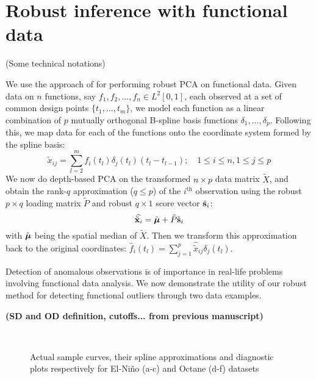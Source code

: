 \section{Robust inference with functional data}

{\colrbf (Some technical notations)}

We use the approach of \cite{BoenteBarrera15} for performing robust PCA on functional data. Given data on $n$ functions, say $f_1, f_2, ..., f_n \in L^2[0,1]$, each observed at a set of common design points $\{ t_1, ..., t_m \} $, we model each function as a linear combination of $p$ mutually orthogonal B-spline basis functions $\delta_1, ..., \delta_p$. Following this, we map data for each of the functions onto the coordinate system formed by the spline basis:
%
\begin{equation}
\tilde x_{ij} = \sum_{l=2}^m f_i(t_l) \delta_j(t_l) (t_l - t_{l-1}); \quad 1 \leq i \leq n, 1 \leq j \leq p
\end{equation}
%
We now do depth-based PCA on the transformed $n \times p$ data matrix $\tilde X$, and obtain the rank-$q$ approximation ($q \leq p$) of the $i^\text{th}$ observation using the robust $p \times q$ loading matrix $\tilde P$ and robust $q \times 1$ score vector $\tilde{{\bf{s}}}_i$:
%
$$ \widehat{\tilde{{\bf{x}}}_i} = \tilde{{\boldsymbol{\mu}}} + \tilde P \tilde {{\bf{s}}}_i $$
%
with $\tilde{{\boldsymbol{\mu}}}$ being the spatial median of $\tilde X$. Then we transform this approximation back to the original coordinates: $\hat f_i (t_l) = \sum_{j=1}^p \widehat{ \tilde x}_{ij} \delta_j (t_l)$.

Detection of anomalous observations is of importance in real-life problems involving functional data analysis. We now demonstrate the utility of our robust method for detecting functional outliers through two data examples. 

\textbf{(SD and OD definition, cutoffs... from previous manuscript)
}

\begin{figure}[t]
\begin{center}
\\
\vspace{-1em}
\caption{Actual sample curves, their spline approximations and diagnostic plots respectively for El-Ni\~no (a-c) and Octane (d-f) datasets}
\label{fig:fPCAfig}
\end{center}
\end{figure}

